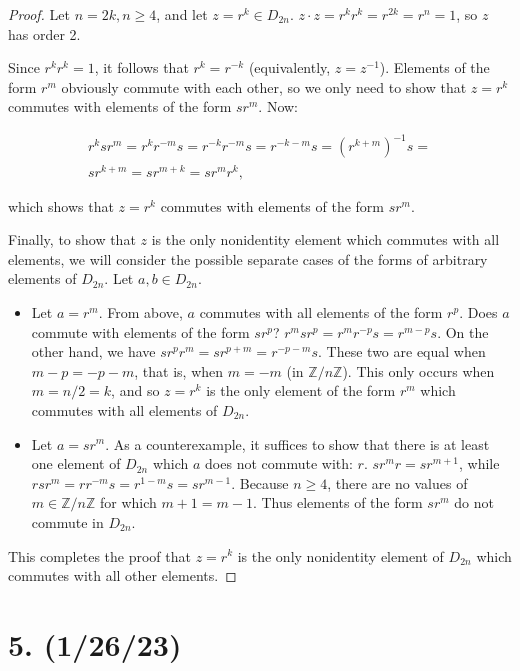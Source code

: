 \documentclass{article}
\begin{document}
\begin{proof}
    Let $n = 2k, n \geq 4$, and let $z = r^k \in D_{2n}$. $z \cdot z = r^k r^k = r^{2k} = r^n = 1$, so $z$ has order 2.

    Since $r^k r^k = 1$, it follows that $r^k = r^{-k}$ (equivalently, $z = z^{-1}$). Elements of the form $r^m$ obviously commute with each other, so we only need to show that $z = r^k$ commutes with elements of the form $sr^m$. Now:

    \begin{multline*}
        r^k sr^m = r^k r^{-m} s = r^{-k} r^{-m} s = r^{-k - m} s = (r^{k + m})^{-1} s = \\
        s r^{k + m} = s r^{m + k} = s r^m r^k,
    \end{multline*}

    which shows that $z = r^k$ commutes with elements of the form $sr^m$.

    Finally, to show that $z$ is the only nonidentity element which commutes with all elements, we will consider the possible separate cases of the forms of arbitrary elements of $D_{2n}$. Let $a, b \in D_{2n}$.

    \begin{itemize}
        \item Let $a = r^m$. From above, $a$ commutes with all elements of the form $r^p$. Does $a$ commute with elements of the form $s r^p$? $r^m sr^p = r^m r^{-p} s = r^{m - p} s$. On the other hand, we have $sr^p r^m = sr^{p + m} = r^{-p - m} s$. These two are equal when $m - p = -p - m$, that is, when $m = -m$ (in $\mathbb{Z}/n\mathbb{Z}$). This only occurs when $m = n / 2 = k$, and so $z = r^k$ is the only element of the form $r^m$ which commutes with all elements of $D_{2n}$.
        \item Let $a = sr^m$. As a counterexample, it suffices to show that there is at least one element of $D_{2n}$ which $a$ does not commute with: $r$. $sr^m r = sr^{m + 1}$, while $r sr^m = r r^{-m} s = r^{1 - m} s = sr^{m - 1}$. Because $n \geq 4$, there are no values of $m \in \mathbb{Z}/n\mathbb{Z}$ for which $m + 1 = m - 1$. Thus elements of the form $sr^m$ do not commute in $D_{2n}$.
    \end{itemize}
    This completes the proof that $z = r^k$ is the only nonidentity element of $D_{2n}$ which commutes with all other elements.

\end{proof}

\section*{5. (1/26/23)}
\end{document}
